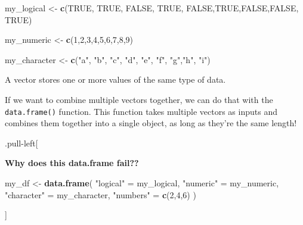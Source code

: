 \documentclass[
]{book}
\newenvironment{Shaded}{\begin{snugshade}}{\end{snugshade}}
\newcommand{\ConstantTok}[1]{\textcolor[rgb]{0.56,0.35,0.01}{#1}}
\newcommand{\DecValTok}[1]{\textcolor[rgb]{0.00,0.00,0.81}{#1}}
\newcommand{\FunctionTok}[1]{\textcolor[rgb]{0.13,0.29,0.53}{\textbf{#1}}}
\newcommand{\NormalTok}[1]{#1}
\newcommand{\OtherTok}[1]{\textcolor[rgb]{0.56,0.35,0.01}{#1}}
\newcommand{\StringTok}[1]{\textcolor[rgb]{0.31,0.60,0.02}{#1}}
\begin{document}
\begin{Shaded}
\begin{Highlighting}[]
\NormalTok{my\_logical }\OtherTok{\textless{}{-}} \FunctionTok{c}\NormalTok{(}\ConstantTok{TRUE}\NormalTok{, }\ConstantTok{TRUE}\NormalTok{, }\ConstantTok{FALSE}\NormalTok{, }\ConstantTok{TRUE}\NormalTok{, }\ConstantTok{FALSE}\NormalTok{,}\ConstantTok{TRUE}\NormalTok{,}\ConstantTok{FALSE}\NormalTok{,}\ConstantTok{FALSE}\NormalTok{, }\ConstantTok{TRUE}\NormalTok{)}

\NormalTok{my\_numeric }\OtherTok{\textless{}{-}} \FunctionTok{c}\NormalTok{(}\DecValTok{1}\NormalTok{,}\DecValTok{2}\NormalTok{,}\DecValTok{3}\NormalTok{,}\DecValTok{4}\NormalTok{,}\DecValTok{5}\NormalTok{,}\DecValTok{6}\NormalTok{,}\DecValTok{7}\NormalTok{,}\DecValTok{8}\NormalTok{,}\DecValTok{9}\NormalTok{)}

\NormalTok{my\_character }\OtherTok{\textless{}{-}} \FunctionTok{c}\NormalTok{(}\StringTok{"a"}\NormalTok{, }\StringTok{"b"}\NormalTok{, }\StringTok{"c"}\NormalTok{, }\StringTok{"d"}\NormalTok{, }\StringTok{"e"}\NormalTok{, }\StringTok{"f"}\NormalTok{, }\StringTok{"g"}\NormalTok{,}\StringTok{"h"}\NormalTok{, }\StringTok{"i"}\NormalTok{)}
\end{Highlighting}
\end{Shaded}

A vector stores one or more values of the same type of data.

If we want to combine multiple vectors together, we can do that with the \texttt{data.frame()} function. This function takes multiple vectors as inputs and combines them together into a single object, as long as they're the same length!

.pull-left{[}

\textbf{Why does this data.frame fail??}

\begin{Shaded}
\begin{Highlighting}[]
\NormalTok{my\_df }\OtherTok{\textless{}{-}} \FunctionTok{data.frame}\NormalTok{(}
  \StringTok{"logical"} \OtherTok{=}\NormalTok{ my\_logical,}
  \StringTok{"numeric"} \OtherTok{=}\NormalTok{ my\_numeric,}
  \StringTok{"character"} \OtherTok{=}\NormalTok{ my\_character,}
  \StringTok{"numbers"} \OtherTok{=} \FunctionTok{c}\NormalTok{(}\DecValTok{2}\NormalTok{,}\DecValTok{4}\NormalTok{,}\DecValTok{6}\NormalTok{)}
\NormalTok{)}
\end{Highlighting}
\end{Shaded}

{]}
\end{document}
